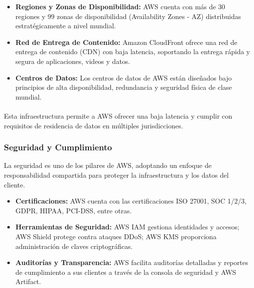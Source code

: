 {                \begin{itemize}
                    \item \textbf{Regiones y Zonas de Disponibilidad:} AWS cuenta con más de 30 regiones y 99 zonas de disponibilidad (Availability Zones - AZ) distribuidas estratégicamente a nivel mundial.
                    \item \textbf{Red de Entrega de Contenido:} Amazon CloudFront ofrece una red de entrega de contenido (CDN) con baja latencia, soportando la entrega rápida y segura de aplicaciones, videos y datos.
                    \item \textbf{Centros de Datos:} Los centros de datos de AWS están diseñados bajo principios de alta disponibilidad, redundancia y seguridad física de clase mundial.
                \end{itemize}
                
                \paragraph{} Esta infraestructura permite a AWS ofrecer una baja latencia y cumplir con requisitos de residencia de datos en múltiples jurisdicciones.
                
            \subsubsection{Seguridad y Cumplimiento}
                La seguridad es uno de los pilares de AWS, adoptando un enfoque de responsabilidad compartida para proteger la infraestructura y los datos del cliente.
                
                \begin{itemize}
                    \item \textbf{Certificaciones:} AWS cuenta con las certificaciones ISO 27001, SOC 1/2/3, GDPR, HIPAA, PCI-DSS, entre otras.
                    \item \textbf{Herramientas de Seguridad:} AWS IAM gestiona identidades y accesos; AWS Shield protege contra ataques DDoS; AWS KMS proporciona administración de claves criptográficas.
                    \item \textbf{Auditorías y Transparencia:} AWS facilita auditorías detalladas y reportes de cumplimiento a sus clientes a través de la consola de seguridad y AWS Artifact.
                \end{itemize}
                
}
